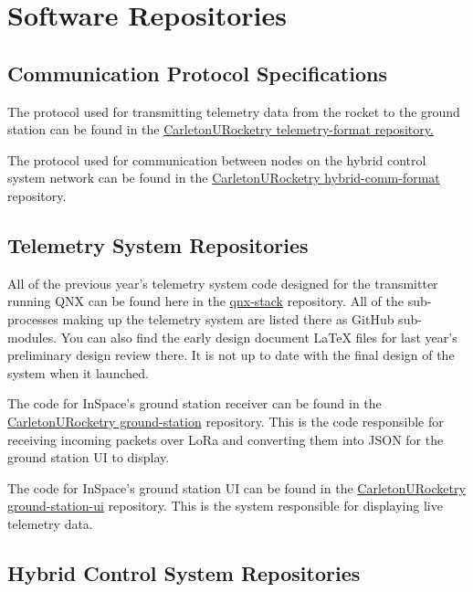 \appendix

\section{Software Repositories}

\subsection{Communication Protocol Specifications}

The protocol used for transmitting telemetry data from the rocket to the ground station can be found in the
\href{https://github.com/CarletonURocketry/telemetry-format/blob/gh-pages/radio_packet_format.pdf}{CarletonURocketry
    telemetry-format repository.}

The protocol used for communication between nodes on the hybrid control system network can be found in the
\href{https://github.com/CarletonURocketry/hybrid-comm-format/blob/gh-pages/spec.pdf}{CarletonURocketry
hybrid-comm-format} repository.

\subsection{Telemetry System Repositories}

All of the previous year's telemetry system code designed for the transmitter running QNX can be found here in the
\href{https://github.com/CarletonURocketry/qnx-stack}{qnx-stack} repository. All of the sub-processes making up the
telemetry system are listed there as GitHub sub-modules. You can also find the early design document LaTeX files for
last year's preliminary design review there. It is not up to date with the final design of the system when it launched.

The code for InSpace's ground station receiver can be found in the
\href{https://github.com/CarletonURocketry/ground-station}{CarletonURocketry ground-station} repository. This is the
code responsible for receiving incoming packets over LoRa and converting them into JSON for the ground station UI to
display.

The code for InSpace's ground station UI can be found in the
\href{https://github.com/CarletonURocketry/ground-station-ui}{CarletonURocketry ground-station-ui} repository. This is
the system responsible for displaying live telemetry data.

\subsection{Hybrid Control System Repositories}


